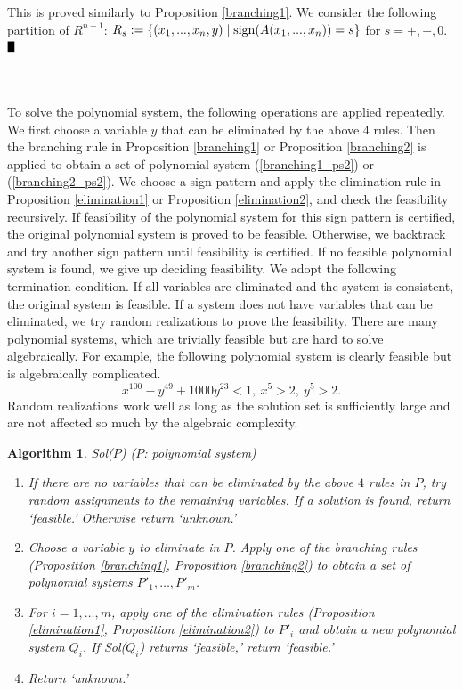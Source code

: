 \documentclass{article}
\def\BBox{\rule{2mm}{3mm}}
\def\QED{\hfill$\BBox$}
\newenvironment{proof}
{\begin{rm}\par\smallskip\noindent{\bf Proof.}\quad}{\QED\end{rm}}
\newtheorem{alg}[thm]{\bfseries Algorithm}
\begin{document}
\begin{proof}
This is proved similarly to Proposition \ref{branching1}. We consider the following partition of $R^{n+1}$:
$R_s:=\{(x_1,...,x_n,y) \mid {\rm sign}(A(x_1,...,x_n)) = s\}$ for $s=+,-,0$.
\end{proof}
\\
\\
To solve the polynomial system, the following operations are applied repeatedly.
We first choose a variable $y$ that can be eliminated by the above 4 rules.
Then the branching rule in Proposition \ref{branching1} or Proposition \ref{branching2} is applied to obtain a set of polynomial system
(\ref{branching1_ps2}) or (\ref{branching2_ps2}).
We choose a sign pattern and apply the elimination rule in Proposition \ref{elimination1} or Proposition \ref{elimination2}, 
and check the feasibility recursively.
If feasibility of the polynomial system for this sign pattern is certified, the original polynomial system
is proved to be feasible. Otherwise, we backtrack and try another sign pattern until feasibility is certified.
If no feasible polynomial system is found, we give up deciding feasibility.
We adopt the following termination condition.
If all variables are eliminated and the system is consistent, 
the original system is feasible.
If a system does not have variables that can be eliminated, we try 
random realizations to prove the feasibility.
There are many polynomial systems, which are trivially feasible but are hard to solve algebraically.
For example, the following polynomial system is clearly feasible but is algebraically complicated.
\[ x^{100}-y^{49}+1000y^{23} < 1, \  x^5 > 2, \ y^5 > 2. \]
Random realizations work well as long as the solution set is sufficiently large
and are not affected so much by the algebraic complexity.

\begin{alg}
Sol($P$) ($P$: polynomial system)
\begin{enumerate}
\item If there are no variables that can be eliminated by the above $4$ rules in $P$, try random assignments to the remaining variables.
If a solution is found, return `feasible.' Otherwise return `unknown.'
\item Choose a variable $y$ to eliminate in $P$. Apply one of the branching rules (Proposition \ref{branching1}, Proposition \ref{branching2})
to obtain a set of polynomial systems $P'_1,\dots,P'_m$.
\item For $i = 1,\dots,m$, apply one of the elimination rules (Proposition \ref{elimination1}, Proposition \ref{elimination2}) 
to $P'_i$ and obtain a new polynomial system $Q_i$. If Sol($Q_i$) returns `feasible,' return `feasible.'
\item Return `unknown.'
\end{enumerate}
\end{alg}
\end{document}
